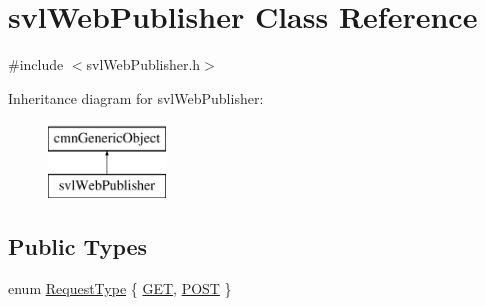 \hypertarget{classsvl_web_publisher}{}\section{svl\+Web\+Publisher Class Reference}
\label{classsvl_web_publisher}


{\ttfamily \#include $<$svl\+Web\+Publisher.\+h$>$}

Inheritance diagram for svl\+Web\+Publisher\+:\begin{figure}[H]
\begin{center}
\leavevmode
\includegraphics[height=2.000000cm]{d5/df7/classsvl_web_publisher}
\end{center}
\end{figure}
\subsection*{Public Types}
\begin{DoxyCompactItemize}
\item 
enum \hyperlink{classsvl_web_publisher_a88f1268e9e8fc3b535e90fc8132643fd}{Request\+Type} \{ \hyperlink{classsvl_web_publisher_a88f1268e9e8fc3b535e90fc8132643fda7af1429896d3bb9288257d80d75622ad}{G\+E\+T}, 
\hyperlink{classsvl_web_publisher_a88f1268e9e8fc3b535e90fc8132643fda805c133e89e47b0be407fd34d3f9188b}{P\+O\+S\+T}
 \}
\end{DoxyCompactItemize}
